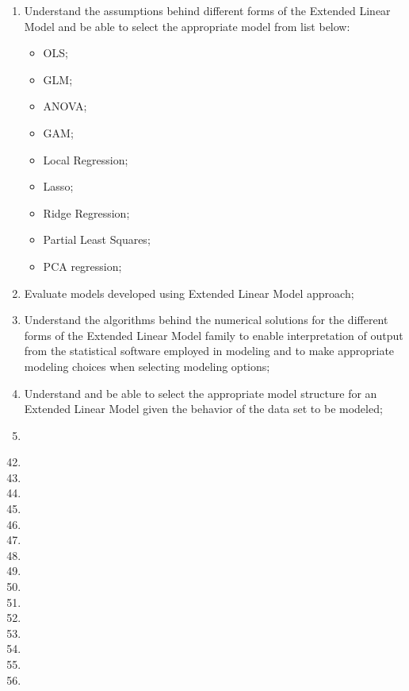 \documentclass[12pt, titlepage, french]{report}
\begin{document}
\begin{outcomes}
\begin{enumerate}
	\item	Understand the assumptions behind different forms of the Extended Linear Model and be able to select the appropriate model from list below:
	\begin{multicols*}{2}
		\begin{itemize}
		\item	OLS;
		\item	GLM;
		\item	ANOVA;
		\item	GAM;
		\item	Local Regression;
		\item	Lasso;
		\item	Ridge Regression;
		\item	Partial Least Squares;
		\item	PCA regression;
		\end{itemize}
	\end{multicols*}
\tcbline
	\item	Evaluate models developed using Extended Linear Model approach;
\tcbline
	\item	Understand the algorithms behind the numerical solutions for the different forms of the Extended Linear Model family to enable interpretation of output from the statistical software employed in modeling and to make appropriate modeling choices when selecting modeling options;
\tcbline
	\item	Understand and be able to select the appropriate model structure for an Extended Linear Model given the behavior of the data set to be modeled;
\tcbline
	\item	
\tcbline
\end{enumerate}
\end{outcomes}

\begin{ASM_chapter}
\begin{enumerate}
  \setcounter{enumi}{41}
	\item	{}
	\item	{}
	\item	{}
	\item	{}
	\item	{}
	\item	{}
	\item	{}
	\item	{}
	\item	{}
	\item	{}
	\item	{}
	\item	{}
	\item	{}
	\item	{}
	\item	{}
\end{enumerate}
\end{ASM_chapter}
\end{document}
